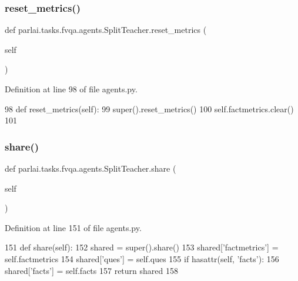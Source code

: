 \subsubsection{\texorpdfstring{reset\+\_\+metrics()}{reset\_metrics()}}
{\footnotesize\ttfamily def parlai.\+tasks.\+fvqa.\+agents.\+Split\+Teacher.\+reset\+\_\+metrics (\begin{DoxyParamCaption}\item[{}]{self }\end{DoxyParamCaption})}



Definition at line 98 of file agents.\+py.


\begin{DoxyCode}
98     \textcolor{keyword}{def }reset\_metrics(self):
99         super().reset\_metrics()
100         self.factmetrics.clear()
101 
\end{DoxyCode}
\mbox{\label{classparlai_1_1tasks_1_1fvqa_1_1agents_1_1SplitTeacher_a9ff9dddf0a570d7c22bdd148e07ad28e}} 
\subsubsection{\texorpdfstring{share()}{share()}}
{\footnotesize\ttfamily def parlai.\+tasks.\+fvqa.\+agents.\+Split\+Teacher.\+share (\begin{DoxyParamCaption}\item[{}]{self }\end{DoxyParamCaption})}



Definition at line 151 of file agents.\+py.


\begin{DoxyCode}
151     \textcolor{keyword}{def }share(self):
152         shared = super().share()
153         shared[\textcolor{stringliteral}{'factmetrics'}] = self.factmetrics
154         shared[\textcolor{stringliteral}{'ques'}] = self.ques
155         \textcolor{keywordflow}{if} hasattr(self, \textcolor{stringliteral}{'facts'}):
156             shared[\textcolor{stringliteral}{'facts'}] = self.facts
157         \textcolor{keywordflow}{return} shared
158 
\end{DoxyCode}


